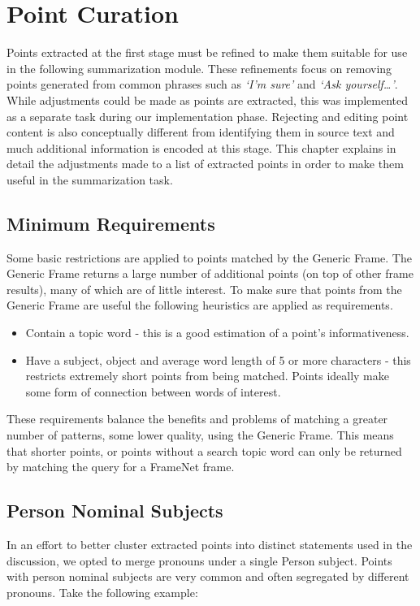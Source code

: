 \chapter{Point Curation\label{chap:point-curation}}
Points extracted at the first stage must be refined to make them suitable for use in the following summarization module. These refinements focus on removing points generated from common phrases such as \textit{`I'm sure'} and \textit{`Ask yourself\dots'}. While adjustments could be made as points are extracted, this was implemented as a separate task during our implementation phase. Rejecting and editing point content is also conceptually different from identifying them in source text and much additional information is encoded at this stage. This chapter explains in detail the adjustments made to a list of extracted points in order to make them useful in the summarization task.

  \section{Minimum Requirements}
    Some basic restrictions are applied to points matched by the Generic Frame. The Generic Frame returns a large number of additional points (on top of other frame results), many of which are of little interest. To make sure that points from the Generic Frame are useful the following heuristics are applied as requirements.

    \begin{itemize}
      \item{Contain a topic word - this is a good estimation of a point's informativeness.}
      \item{Have a subject, object and average word length of 5 or more characters - this restricts extremely short points from being matched. Points ideally make some form of connection between words of interest.}
    \end{itemize}

    These requirements balance the benefits and problems of matching a greater number of patterns, some lower quality, using the Generic Frame. This means that shorter points, or points without a search topic word can only be returned by matching the query for a FrameNet frame.

  \section{Person Nominal Subjects}
    In an effort to better cluster extracted points into distinct statements used in the discussion, we opted to merge pronouns under a single Person subject. Points with person nominal subjects are very common and often segregated by different pronouns. Take the following example:

